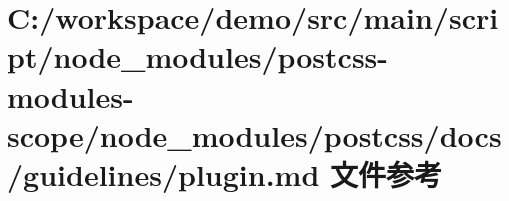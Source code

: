 \hypertarget{postcss-modules-scope_2node__modules_2postcss_2docs_2guidelines_2plugin_8md}{}\section{C\+:/workspace/demo/src/main/script/node\+\_\+modules/postcss-\/modules-\/scope/node\+\_\+modules/postcss/docs/guidelines/plugin.md 文件参考}
\label{postcss-modules-scope_2node__modules_2postcss_2docs_2guidelines_2plugin_8md}
